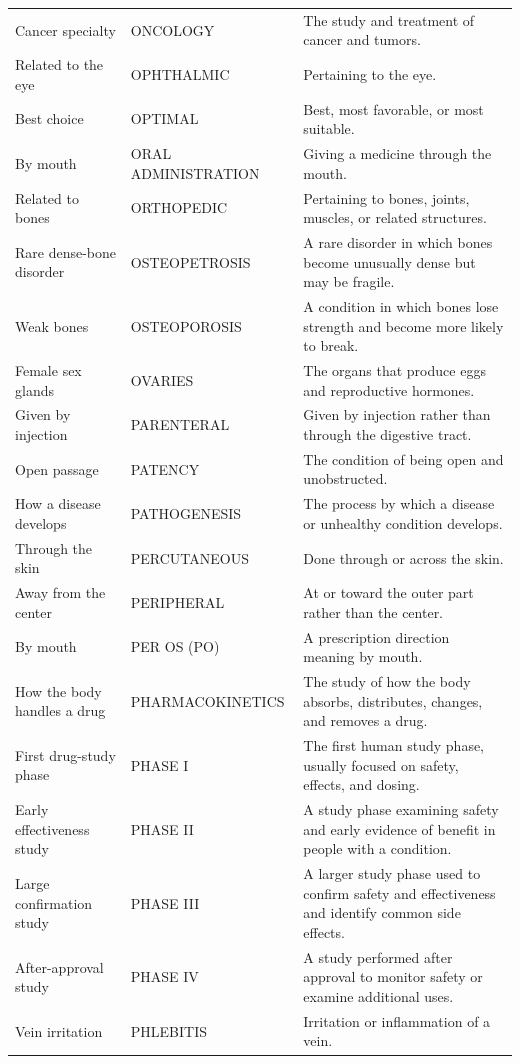 \begin{longtable}{>{\raggedright\arraybackslash}p{} >{\raggedright\arraybackslash}p{} >{\raggedright\arraybackslash}p{}}
Cancer specialty & ONCOLOGY & The study and treatment of cancer and tumors. \\
Related to the eye & OPHTHALMIC & Pertaining to the eye. \\
Best choice & OPTIMAL & Best, most favorable, or most suitable. \\
By mouth & ORAL ADMINISTRATION & Giving a medicine through the mouth. \\
Related to bones & ORTHOPEDIC & Pertaining to bones, joints, muscles, or related structures. \\
Rare dense-bone disorder & OSTEOPETROSIS & A rare disorder in which bones become unusually dense but may be fragile. \\
Weak bones & OSTEOPOROSIS & A condition in which bones lose strength and become more likely to break. \\
Female sex glands & OVARIES & The organs that produce eggs and reproductive hormones. \\
Given by injection & PARENTERAL & Given by injection rather than through the digestive tract. \\
Open passage & PATENCY & The condition of being open and unobstructed. \\
How a disease develops & PATHOGENESIS & The process by which a disease or unhealthy condition develops. \\
Through the skin & PERCUTANEOUS & Done through or across the skin. \\
Away from the center & PERIPHERAL & At or toward the outer part rather than the center. \\
By mouth & PER OS (PO) & A prescription direction meaning by mouth. \\
How the body handles a drug & PHARMACOKINETICS & The study of how the body absorbs, distributes, changes, and removes a drug. \\
First drug-study phase & PHASE I & The first human study phase, usually focused on safety, effects, and dosing. \\
Early effectiveness study & PHASE II & A study phase examining safety and early evidence of benefit in people with a condition. \\
Large confirmation study & PHASE III & A larger study phase used to confirm safety and effectiveness and identify common side effects. \\
After-approval study & PHASE IV & A study performed after approval to monitor safety or examine additional uses. \\
Vein irritation & PHLEBITIS & Irritation or inflammation of a vein. \\

\end{longtable}
